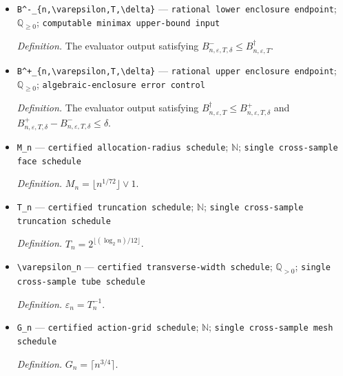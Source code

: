 \documentclass{article}
\begin{document}
\begin{itemize}
  \par\smallskip\noindent\emph{Definition.} \(B_{n,\varepsilon,T}^\dagger=\min_{r\in\mathcal R_{n,3}}\mathcal B_{n,\varepsilon,T}^\dagger(r)\).
  \item \texttt{B\textasciicircum{}-\allowbreak{}\_\allowbreak{}\{n,\allowbreak{}\textbackslash{}\allowbreak{}varepsilon,\allowbreak{}T,\allowbreak{}\textbackslash{}\allowbreak{}delta\}\allowbreak{}} --- \texttt{rational lower enclosure endpoint}; \(\mathbb Q_{\ge0}\); \texttt{computable minimax upper-\allowbreak{}bound input}
  \par\smallskip\noindent\emph{Definition.} The evaluator output satisfying \(B^-_{n,\varepsilon,T,\delta}\le B_{n,\varepsilon,T}^\dagger\).
  \item \texttt{B\textasciicircum{}+\allowbreak{}\_\allowbreak{}\{n,\allowbreak{}\textbackslash{}\allowbreak{}varepsilon,\allowbreak{}T,\allowbreak{}\textbackslash{}\allowbreak{}delta\}\allowbreak{}} --- \texttt{rational upper enclosure endpoint}; \(\mathbb Q_{\ge0}\); \texttt{algebraic-\allowbreak{}enclosure error control}
  \par\smallskip\noindent\emph{Definition.} The evaluator output satisfying \(B_{n,\varepsilon,T}^\dagger\le B^+_{n,\varepsilon,T,\delta}\) and \(B^+_{n,\varepsilon,T,\delta}-B^-_{n,\varepsilon,T,\delta}\le\delta\).
  \item \texttt{M\_\allowbreak{}n} --- \texttt{certified allocation-\allowbreak{}radius schedule}; \(\mathbb N\); \texttt{single cross-\allowbreak{}sample face schedule}
  \par\smallskip\noindent\emph{Definition.} \(M_n=\lfloor n^{1/72}\rfloor\vee1\).
  \item \texttt{T\_\allowbreak{}n} --- \texttt{certified truncation schedule}; \(\mathbb N\); \texttt{single cross-\allowbreak{}sample truncation schedule}
  \par\smallskip\noindent\emph{Definition.} \(T_n=2^{\lfloor(\log_2n)/12\rfloor}\).
  \item \texttt{\textbackslash{}\allowbreak{}varepsilon\_\allowbreak{}n} --- \texttt{certified transverse-\allowbreak{}width schedule}; \(\mathbb Q_{>0}\); \texttt{single cross-\allowbreak{}sample tube schedule}
  \par\smallskip\noindent\emph{Definition.} \(\varepsilon_n=T_n^{-1}\).
  \item \texttt{G\_\allowbreak{}n} --- \texttt{certified action-\allowbreak{}grid schedule}; \(\mathbb N\); \texttt{single cross-\allowbreak{}sample mesh schedule}
  \par\smallskip\noindent\emph{Definition.} \(G_n=\lceil n^{3/4}\rceil\).

\end{itemize}
\end{document}
